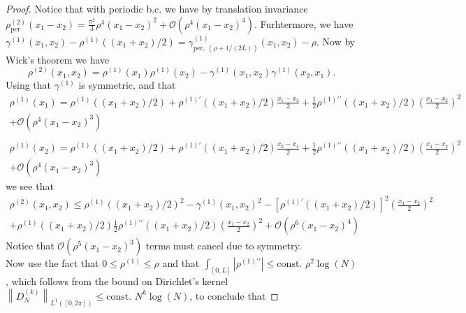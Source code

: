 \documentclass[a4paper,11pt]{article}
\newcommand{\norm}[1]{\left\lVert #1 \right\rVert}
\newcommand{\abs}[1]{\left\lvert #1 \right\rvert}
\numberwithin{equation}{section}
\begin{document}
		\begin{proof}
			Notice that with periodic b.c. we have by translation invariance $ \rho^{(2)}_{\text{per}}(x_1-x_2)=\frac{\pi^2}{3}\rho^4(x_1-x_2)^2+\mathcal{O}(\rho^4(x_1-x_2)^4) $. Furhtermore, we have $ \gamma^{(1)}(x_1,x_2)-\rho^{(1)}\left((x_1+x_2)/2\right)=\gamma_{\text{per},\ (\rho+1/(2L))}^{(1)}(x_1,x_2)-\rho $. Now by Wick's theorem we have \begin{equation}
			\rho^{(2)}(x_1,x_2)=\rho^{(1)}(x_1)\rho^{(1)}(x_2)-\gamma^{(1)}(x_1,x_2)\gamma^{(1)}(x_2,x_1).
			\end{equation}
			Using that $ \gamma^{(1)} $ is symmetric, and that \begin{equation}
				\begin{aligned}
				\rho^{(1)}(x_1)=\rho^{(1)}((x_1+x_2)/2)+\rho^{(1)\prime}((x_1+x_2)/2)\frac{x_1-x_2}{2}+\frac{1}{2}\rho^{(1)\prime\prime}((x_1+x_2)/2)\left(\frac{x_1-x_2}{2}\right)^2\\+\mathcal{O}(\rho^4(x_1-x_2)^3)\\
				\end{aligned}
				\end{equation}
				\begin{equation}
				\begin{aligned}
				\rho^{(1)}(x_2)=\rho^{(1)}((x_1+x_2)/2)+\rho^{(1)\prime}((x_1+x_2)/2)\frac{x_2-x_1}{2}+\frac{1}{2}\rho^{(1)\prime\prime}((x_1+x_2)/2)\left(\frac{x_1-x_2}{2}\right)^2\\+\mathcal{O}(\rho^4(x_1-x_2)^3)
				\end{aligned}
			\end{equation}
			we see that \begin{equation}
			\begin{aligned}
			\rho^{(2)}(x_1,x_2)\leq\rho^{(1)}((x_1+x_2)/2)^2-\gamma^{(1)}(x_1,x_2)^2-\left[\rho^{(1)\prime}((x_1+x_2)/2)\right]^2\left(\frac{x_1-x_2}{2}\right)^2\\+\rho^{(1)}((x_1+x_2)/2)\frac{1}{2}\rho^{(1)\prime\prime}((x_1+x_2)/2)\left(\frac{x_1-x_2}{2}\right)^2+\mathcal{O}(\rho^6(x_1-x_2)^4)
			\end{aligned}
			\end{equation}
			Notice that $ \mathcal{O}(\rho^5(x_1-x_2)^3) $ terms must cancel due to symmetry.\\
			Now use the fact that $ 0\leq\rho^{(1)}\leq \rho $ and that $\int_{[0,L]}\abs{\rho^{(1)\prime\prime}}\leq \text{const. }\rho^2\log(N) $, which follows from the bound on Dirichlet's kernel $ \norm{D_N^{(k)}}_{L^1([0,2\pi])}\leq \text{const. }N^{k}\log(N) $, to conclude that

\end{proof}
\end{document}
